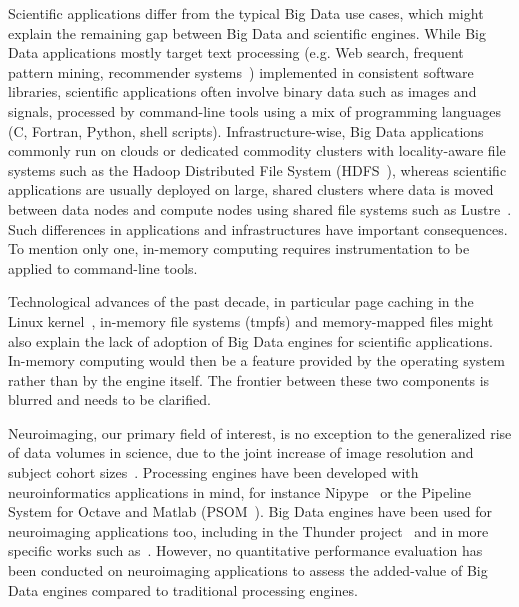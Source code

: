 \documentclass{IEEEtran}
\begin{document}
Scientific applications differ from the typical Big Data use 
cases, which might explain the remaining gap between Big Data and 
scientific engines. While Big Data applications mostly target text 
processing (e.g. Web search, frequent pattern mining, recommender 
systems~\cite{leskovec2014mining}) implemented in consistent software 
libraries, scientific applications often involve 
binary data such as images and signals, processed by command-line tools 
using a mix of programming languages (C, Fortran, Python, shell 
scripts). Infrastructure-wise, Big Data applications commonly run on 
clouds or dedicated commodity clusters with locality-aware file systems 
such as the Hadoop Distributed File System 
(HDFS~\cite{shvachko2010hadoop}), whereas scientific applications are 
usually deployed on large, shared clusters where data is moved between
data nodes and compute nodes using shared file systems such 
as Lustre~\cite{schwan2003lustre}. Such differences in applications and 
infrastructures have important consequences. To 
mention only one, in-memory computing requires instrumentation to be 
applied to command-line tools. 

Technological advances of the past decade, in particular page caching 
in the Linux kernel~\cite{love2010linux}, in-memory file systems 
(tmpfs) and memory-mapped files might also 
explain the lack of adoption of Big Data engines for scientific 
applications.
In-memory computing would then be a feature provided by 
the operating system rather than by the engine itself. The frontier 
between these two components is blurred and needs to be clarified.



Neuroimaging, our primary field of interest, is no exception to the 
generalized rise of data volumes in science, due to the joint increase 
of image resolution and subject cohort sizes~\cite{van2014human}. 
Processing engines have been developed with neuroinformatics 
applications in mind, for instance Nipype~\cite{gorgolewski2011nipype} 
or the Pipeline System for Octave and Matlab 
(PSOM~\cite{bellec2012pipeline}). Big Data engines have been used for 
neuroimaging applications too, including in the Thunder 
project~\cite{freeman2014mapping} and in more specific works such 
as~\cite{makkie2019fast}. However, no quantitative performance 
evaluation has been conducted on neuroimaging applications to assess the 
added-value of Big Data engines compared to traditional processing engines.
\end{document}
